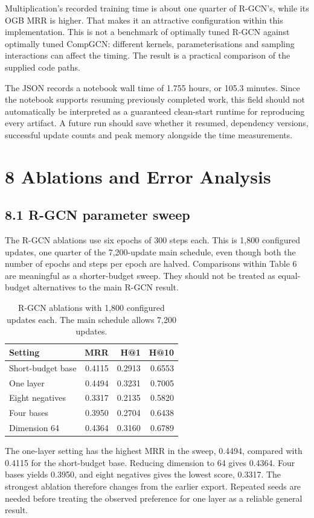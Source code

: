 \documentclass[11pt]{article}
\begin{document}
Multiplication's recorded training time is about one quarter of R-GCN's, while its OGB MRR is higher. That makes it an attractive configuration within this implementation. This is not a benchmark of optimally tuned R-GCN against optimally tuned CompGCN: different kernels, parameterisations and sampling interactions can affect the timing. The result is a practical comparison of the supplied code paths.

The JSON records a notebook wall time of 1.755 hours, or 105.3 minutes. Since the notebook supports resuming previously completed work, this field should not automatically be interpreted as a guaranteed clean-start runtime for reproducing every artifact. A future run should save whether it resumed, dependency versions, successful update counts and peak memory alongside the time measurements.

\section*{8 Ablations and Error Analysis}
\subsection*{8.1 R-GCN parameter sweep}
The R-GCN ablations use six epochs of 300 steps each. This is 1,800 configured updates, one quarter of the 7,200-update main schedule, even though both the number of epochs and steps per epoch are halved. Comparisons within Table 6 are meaningful as a shorter-budget sweep. They should not be treated as equal-budget alternatives to the main R-GCN result.

\begin{table}[t]\centering\small
\setlength{\tabcolsep}{3pt}
\begin{tabular}{lrrr}
\toprule
Setting & MRR & H@1 & H@10 \\ \midrule
Short-budget base & 0.4115 & 0.2913 & 0.6553 \\
One layer & 0.4494 & 0.3231 & 0.7005 \\
Eight negatives & 0.3317 & 0.2135 & 0.5820 \\
Four bases & 0.3950 & 0.2704 & 0.6438 \\
Dimension 64 & 0.4364 & 0.3160 & 0.6789 \\
\bottomrule\end{tabular}
\caption{R-GCN ablations with 1,800 configured updates each. The main schedule allows 7,200 updates.}\end{table}
The one-layer setting has the highest MRR in the sweep, 0.4494, compared with 0.4115 for the short-budget base. Reducing dimension to 64 gives 0.4364. Four bases yields 0.3950, and eight negatives gives the lowest score, 0.3317. The strongest ablation therefore changes from the earlier export. Repeated seeds are needed before treating the observed preference for one layer as a reliable general result.
\end{document}
